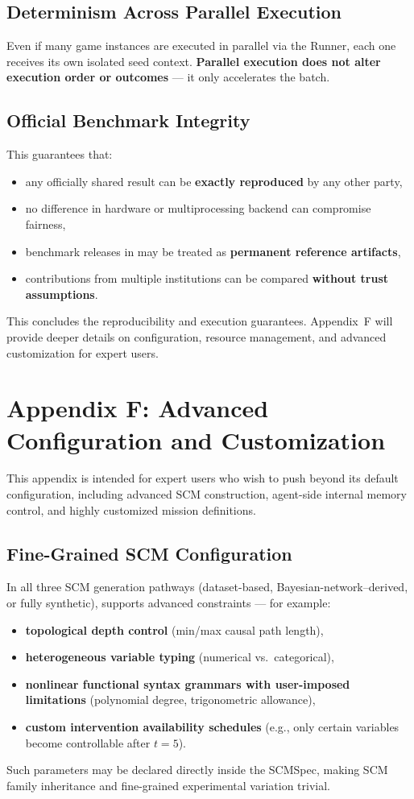 \subsection{Determinism Across Parallel Execution}
Even if many game instances are executed in parallel via the Runner, each one receives its own isolated seed context.  
\textbf{Parallel execution does not alter execution order or outcomes} — it only accelerates the batch.

\subsection{Official Benchmark Integrity}
This guarantees that:
\begin{itemize}
    \item any officially shared result can be \textbf{exactly reproduced} by any other party,
    \item no difference in hardware or multiprocessing backend can compromise fairness,
    \item benchmark releases in \game may be treated as \textbf{permanent reference artifacts},
    \item contributions from multiple institutions can be compared \textbf{without trust assumptions}.
\end{itemize}

\bigskip
This concludes the reproducibility and execution guarantees.  
Appendix~F will provide deeper details on configuration, resource management, and advanced customization for expert users.

\section{Appendix F: Advanced Configuration and Customization}
\label{appendix:advanced}

This appendix is intended for expert users who wish to push \game beyond its default configuration,
including advanced SCM construction, agent-side internal memory control, and highly customized mission definitions.

\subsection{Fine-Grained SCM Configuration}
In all three SCM generation pathways (dataset-based, Bayesian-network–derived, or fully synthetic), 
\game supports advanced constraints — for example:
\begin{itemize}
    \item \textbf{topological depth control} (min/max causal path length),
    \item \textbf{heterogeneous variable typing} (numerical vs.\ categorical),
    \item \textbf{nonlinear functional syntax grammars with user-imposed limitations} (polynomial degree, trigonometric allowance),
    \item \textbf{custom intervention availability schedules} (e.g., only certain variables become controllable after $t{=}5$).
\end{itemize}
Such parameters may be declared directly inside the SCMSpec, making SCM family inheritance and fine-grained experimental variation trivial.

